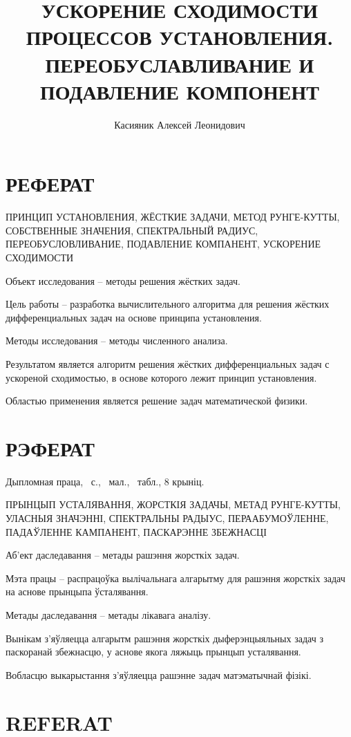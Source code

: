 \documentclass[a4paper,14pt]{extreport}
\title{УСКОРЕНИЕ СХОДИМОСТИ ПРОЦЕССОВ УСТАНОВЛЕНИЯ. ПЕРЕОБУСЛАВЛИВАНИЕ И ПОДАВЛЕНИЕ КОМПОНЕНТ}
\author{Касияник Алексей Леонидович}
\begin{document}
  \maketitle
  
  \setcounter{page}{2}
\newpage
\chapter*{РЕФЕРАТ}


ПРИНЦИП УСТАНОВЛЕНИЯ, ЖЁСТКИЕ ЗАДАЧИ, МЕТОД РУНГЕ-КУТТЫ, СОБСТВЕННЫЕ ЗНАЧЕНИЯ, СПЕКТРАЛЬНЫЙ РАДИУС, ПЕРЕОБУСЛОВЛИВАНИЕ, ПОДАВЛЕНИЕ КОМПАНЕНТ, УСКОРЕНИЕ СХОДИМОСТИ

Объект исследования – методы решения жёстких задач.

Цель работы – разработка вычислительного алгоритма для решения жёстких дифференциальных задач на основе принципа установления.

Методы исследования – методы численного анализа.%

Результатом является алгоритм решения жёстких дифференциальных задач с ускореной сходимостью, в основе которого лежит принцип установления.

Областью применения является решение задач математической физики.

\chapter*{РЭФЕРАТ}

Дыпломная праца, \pageref{LastPage}~с., \totfig~мал., \tottab~табл., 8 крыніц.

ПРЫНЦЫП УСТАЛЯВАННЯ, ЖОРСТКІЯ ЗАДАЧЫ, МЕТАД РУНГЕ-КУТТЫ, УЛАСНЫЯ ЗНАЧЭННІ, СПЕКТРАЛЬНЫ РАДЫУС, ПЕРААБУМОЎЛЕННЕ, ПАДАЎЛЕННЕ КАМПАНЕНТ, ПАСКАРЭННЕ ЗБЕЖНАСЦІ

Аб'ект даследавання – метады рашэння жорсткіх задач.

Мэта працы – распрацоўка вылічальнага алгарытму для рашэння жорсткіх задач на аснове прынцыпа ўсталявання.

Метады даследавання – метады лікавага аналізу.%

Вынікам з'яўляецца алгарытм рашэння жорсткіх дыферэнцыяльных задач з паскоранай збежнасцю, у аснове якога ляжыць прынцып усталявання.

Вобласцю выкарыстання з'яўляецца рашэнне задач матэматычнай фізікі.

\chapter*{REFERAT}
\end{document}
